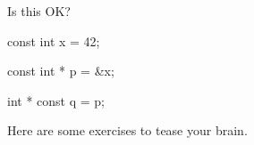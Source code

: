 Is this OK?



\begin{consolethree}[escapeinside=||]

const int x = 42;

const int * p = &x;

int * const q = p;

\end{consolethree}

Here are some exercises to tease your brain.

